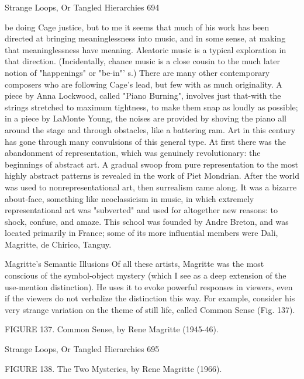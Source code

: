 Strange Loops, Or Tangled Hierarchies                                                    694

be doing Cage justice, but to me it seems that much of his work has been directed at
bringing meaninglessness into music, and in some sense, at making that meaninglessness
have meaning. Aleatoric music is a typical exploration in that direction. (Incidentally,
chance music is a close cousin to the much later notion of "happenings" or "be-in"' s.)
There are many other contemporary composers who are following Cage's lead, but few
with as much originality. A piece by Anna Lockwood, called "Piano Burning", involves
just that-with the strings stretched to maximum tightness, to make them snap as loudly as
possible; in a piece by LaMonte Young, the noises are provided by shoving the piano all
around the stage and through obstacles, like a battering ram.
        Art in this century has gone through many convulsions of this general type. At
first there was the abandonment of representation, which was genuinely revolutionary:
the beginnings of abstract art. A gradual swoop from pure representation to the most
highly abstract patterns is revealed in the work of Piet Mondrian. After the world was
used to nonrepresentational art, then surrealism came along. It was a bizarre about-face,
something like neoclassicism in music, in which extremely representational art was
"subverted" and used for altogether new reasons: to shock, confuse, and amaze. This
school was founded by Andre Breton, and was located primarily in France; some of its
more influential members were Dali, Magritte, de Chirico, Tanguy.

                          Magritte's Semantic Illusions
Of all these artists, Magritte was the most conscious of the symbol-object mystery (which
I see as a deep extension of the use-mention distinction). He uses it to evoke powerful
responses in viewers, even if the viewers do not verbalize the distinction this way. For
example, consider his very strange variation on the theme of still life, called Common
Sense (Fig. 137).

              FIGURE 137. Common Sense, by Rene Magritte (1945-46).




Strange Loops, Or Tangled Hierarchies                                                695

                FIGURE 138. The Two Mysteries, by Rene Magritte (1966).

